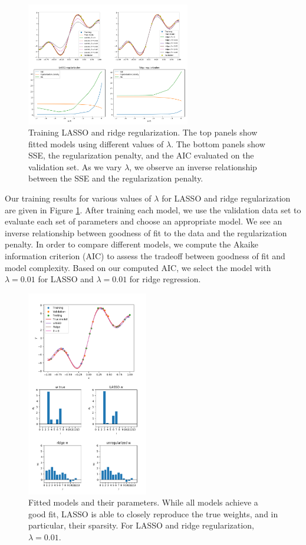 \documentclass[10pt, twocolumn]{article}
\begin{document}
\begin{figure}
\caption{Training LASSO and ridge regularization. The top panels show fitted models using different values of $\lambda$. The bottom panels show SSE, the regularization penalty, and the AIC evaluated on the validation set. As we vary $\lambda$, we observe an inverse relationship between the SSE and the regularization penalty.}
\begin{center}
\includegraphics[width=270px]{all_training}
\end{center}
\label{fig:train_lasso}
\end{figure}

Our training results for various values of $\lambda$ for LASSO and ridge regularization are given in Figure \ref{fig:train_lasso}. After training each model, we use the validation data set to evaluate each set of parameters and choose an appropriate model. We see an inverse relationship between goodness of fit to the data and the regularization penalty. In order to compare different models, we compute the Akaike information criterion (AIC) to assess the tradeoff between goodness of fit and model complexity. Based on our computed AIC, we select the model with $\lambda=0.01$ for LASSO and $\lambda=0.01$ for ridge regression.

\begin{figure}
\caption{Fitted models and their parameters. While all models achieve a good fit, LASSO is able to closely reproduce the true weights, and in particular, their sparsity. For LASSO and ridge regularization, $\lambda=0.01$.}
\begin{center}
\includegraphics[width=200px]{final_fitting_results}
\end{center}
\label{fig:final_lasso_test}
\end{figure}
\end{document}

